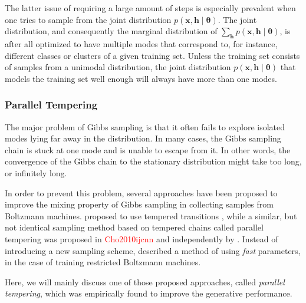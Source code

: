 \documentclass{now}
\newcommand{\vect}[1]{\mathbf{#1}}
\newcommand{\vects}[1]{\boldsymbol{#1}}
\newcommand{\vh}[0]{\vect{h}}
\newcommand{\vx}[0]{\vect{x}}
\newcommand{\TT}[0]{{\vects{\theta}}}
\newcommand{\alert}[1]{\textcolor{red}{#1}}
\newcommand{\citepub}[1]{\alert{#1}}
\begin{document}
The latter issue of requiring a large amount of steps is
especially prevalent when one tries to sample from the joint
distribution $p(\vx, \vh \mid \TT)$.  The joint distribution, and
consequently the marginal distribution of $\sum_{\vh} p(\vx, \vh
        \mid \TT)$, is after all optimized to have multiple modes
that correspond to, for instance, different classes or clusters
of a given training set. Unless the training set consists of
samples from a unimodal distribution, the joint distribution
$p(\vx, \vh \mid \TT)$ that models the training set well enough
will always have more than one modes.


\subsubsection{Parallel Tempering}
\label{sec:parallel_tempering}


The major problem of Gibbs sampling is that it often
fails to explore isolated modes lying far away in the
distribution.  In many cases, the Gibbs sampling chain is
stuck at one mode and is unable to escape from it. In other
words, the convergence of the Gibbs chain to the stationary
distribution might take too long, or infinitely long.

In order to prevent this problem, several approaches have
been proposed to improve the mixing property of Gibbs
sampling in collecting samples from Boltzmann machines.
\citet{Salakhutdinov2009} proposed to use tempered
transitions \citep{Neal1994}, while a similar, but not
identical sampling method based on tempered chains called
parallel tempering was proposed in
\citepub{Cho2010ijcnn} and independently by
\citet{Desjardins2010,Desjardins2010a}.  Instead of
introducing a new sampling scheme, \citet{Tieleman2009}
described a method of using \textit{fast} parameters,
in the case of training restricted Boltzmann
machines.

Here, we will mainly discuss one of those proposed
approaches, called \textit{parallel tempering}, which was
empirically found to improve the generative performance.
\end{document}

